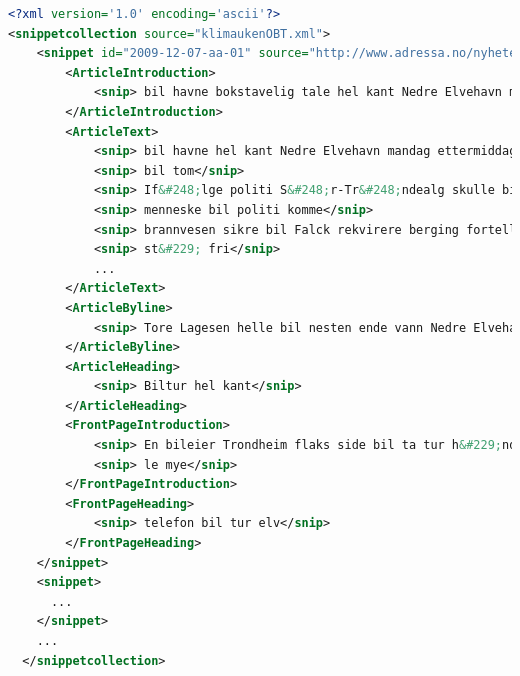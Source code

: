 \begin{lstlisting}[float=ht, language=xml, breaklines=true, label=lst:snippetfile, caption={Snippet file encoded in XML}]
<?xml version='1.0' encoding='ascii'?>
<snippetcollection source="klimaukenOBT.xml">
    <snippet id="2009-12-07-aa-01" source="http://www.adressa.no/nyheter/trondheim/article1419658.ece" tags="Innenriks-ulykker-trafikk-utforkj&#248;ring-trondheim">
        <ArticleIntroduction>
            <snip> bil havne bokstavelig tale hel kant Nedre Elvehavn mandag ettermiddag</snip>
        </ArticleIntroduction>
        <ArticleText>
            <snip> bil havne hel kant Nedre Elvehavn mandag ettermiddag</snip>
            <snip> bil tom</snip>
            <snip> If&#248;lge politi S&#248;r-Tr&#248;ndealg skulle bil tom komme sted</snip>
            <snip> menneske bil politi komme</snip>
            <snip> brannvesen sikre bil Falck rekvirere berging fortelle Curt Ivar R&#248;hmen operasjonsleder S&#248;r-Tr&#248;ndelag politidistrikt</snip>
            <snip> st&#229; fri</snip>
            ...
        </ArticleText>
        <ArticleByline>
            <snip> Tore Lagesen helle bil nesten ende vann Nedre Elvehavn</snip>
        </ArticleByline>
        <ArticleHeading>
            <snip> Biltur hel kant</snip>
        </ArticleHeading>
        <FrontPageIntroduction>
            <snip> En bileier Trondheim flaks side bil ta tur h&#229;nd mandag ettermiddag</snip>
            <snip> le mye</snip>
        </FrontPageIntroduction>
        <FrontPageHeading>
            <snip> telefon bil tur elv</snip>
        </FrontPageHeading>
    </snippet>
    <snippet>
      ...
    </snippet>
    ...
  </snippetcollection>
\end{lstlisting}

